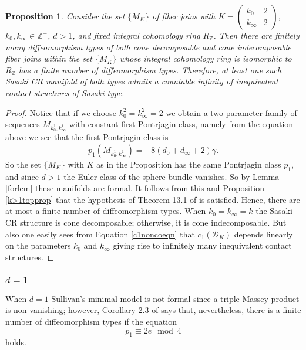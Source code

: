 \documentclass[12pt]{amsart}
\newtheorem{proposition}[theorem]{Proposition}
\def\bbz{{\mathbb Z}}
\def\grg{\gamma}
\def\cald{{\mathcal D}}
\begin{document}
\begin{proposition}\label{infcontman}
Consider the set $\{M_K\}$ of  fiber joins with $K= \begin{pmatrix}
    k_0 & 2 \\
   k_\infty & 2
\end{pmatrix}$, $k_0,k_\infty\in\bbz^+$, $d>1$,
and fixed integral cohomology ring $R_\bbz$. Then there are finitely many diffeomorphism types of both  cone decomposable and cone indecomposable fiber joins within the set $\{M_{K}\}$ whose integral cohomology ring is isomorphic to $R_\bbz$ has a finite number of diffeomorphism types.
Therefore, at least one such Sasaki CR manifold of both types admits a countable infinity of inequivalent contact structures of Sasaki type.
\end{proposition}


\begin{proof}
Notice that if we choose $k^2_0=k^2_\infty=2$ we obtain a two parameter family of sequences $M_{k^1_0,k^1_\infty}$ with constant first Pontrjagin class, namely from the equation above we see that the first Pontrjagin class is
\begin{equation}\label{specialp1}
p_1(M_{k^1_0,k^1_\infty})=-8(d_0+d_\infty+2)\grg.
\end{equation}
So the set $\{M_K\}$ with $K$ as in the Proposition has the same Pontrjagin class $p_1$, and since $d>1$ the Euler class of the sphere bundle vanishes. So by Lemma \ref{forlem} these manifolds are formal. It follows from this and Proposition \ref{k>1topprop} that the hypothesis of Theorem 13.1 of \cite{Sul77} is satisfied. Hence, there are at most a finite number of diffeomorphism types. When $k_0=k_\infty=k$ the Sasaki CR structure is cone decomposable; otherwise, it is cone indecomposable. But also one easily sees from Equation \eqref{c1noncoeqn} that $c_1(\cald_K)$ depends linearly on the parameters $k_0$ and $k_\infty$ giving rise to infinitely many inequivalent contact structures. 
\end{proof}


\subsubsection{$d=1$}  When $d=1$ Sullivan's minimal model is not formal \cite{KrTr91,BFMT16} since a triple Massey product is non-vanishing; however, Corollary 2.3 of \cite{KrTr91} says that, nevertheless, there is a finite number of diffeomorphism types if the equation
\begin{equation}\label{p1=2e}
p_1\equiv 2e\mod 4
\end{equation}
holds.
\end{document}
